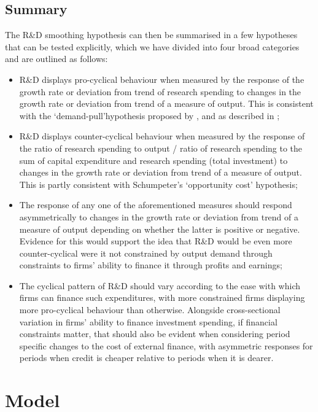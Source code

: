\documentclass{_latex/house}
\begin{document}
\subsection{Summary} \label{secondsummary}
The R\&D smoothing hypothesis can then be summarised in a few hypotheses that can be tested explicitly, which we have divided into four broad categories and are outlined as follows:
\begin{itemize}
\item R\&D displays pro-cyclical behaviour when measured by the response of the growth rate or deviation from trend of research spending to changes in the growth rate or deviation from trend of a measure of output. This is consistent with the \textquoteleft demand-pull\textquoteright\:hypothesis proposed by \cite{2079533}, and as described in \cite{RePEc:eee:respol:v:19:y:1990:i:4:p:387-394};
\item R\&D displays counter-cyclical behaviour when measured by the response of the ratio of research spending to output / ratio of research spending to the sum of capital expenditure and research spending (total investment) to changes in the growth rate or deviation from trend of a measure of output. This is partly consistent with Schumpeter's \textquoteleft opportunity cost\textquoteright\: hypothesis;
\item The response of any one of the aforementioned measures should respond asymmetrically to changes in the growth rate or deviation from trend of a measure of output depending on whether the latter is positive or negative. Evidence for this would support the idea that R\&D would be even more counter-cyclical were it not constrained by output demand through constraints to firms' ability to finance it through profits and earnings;
\item The cyclical pattern of R\&D should vary according to the ease with which firms can finance such expenditures, with more constrained firms displaying more pro-cyclical behaviour than otherwise. Alongside cross-sectional variation in firms' ability to finance investment spending, if financial constraints matter, that should also be evident when considering period specific changes to the cost of external finance, with asymmetric responses for periods when credit is cheaper relative to periods when it is dearer.
\end{itemize}

\section{Model} \label{model}
\end{document}
